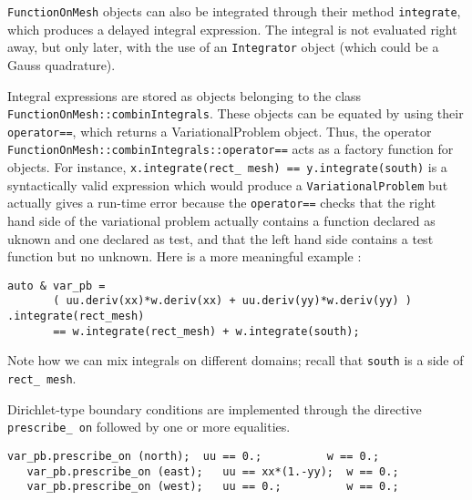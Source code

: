 {\small\tt FunctionOnMesh} objects can also be integrated through their method
{\small\tt integrate}, which produces a delayed integral expression.
The integral is not evaluated right away, but only later, with the use of an
{\small\tt Integrator} object (which could be a Gauss quadrature).

Integral expressions are stored as objects belonging to the class\hfil\break
{\small\tt FunctionOnMesh::combinIntegrals}.
These objects can be equated by using their\hfil\break
{\small\tt operator==}, which returns a {VariationalProblem} object.
Thus, the operator\hfil\break
{\small\tt FunctionOnMesh::combinIntegrals::operator==} acts as a factory function
for\hfil{} objects.
For instance, {\small\tt x.integrate(rect\_\,mesh) == y.integrate(south)} is a syntactically valid
expression which would produce a {\small\tt VariationalProblem} but actually
gives a run-time error because the {\small\tt operator==} checks that the right hand side
of the variational problem actually contains a function declared as uknown and one
declared as test, and that the left hand side contains a test function but no unknown.
Here is a more meaningful example :

\begin{Verbatim}[commandchars=\\\{\},formatcom=\small\tt,
   baselinestretch=0.94,framesep=2mm                      ]
   auto & var_pb =
       ( uu.deriv(xx)*w.deriv(xx) + uu.deriv(yy)*w.deriv(yy) ) .integrate(rect_mesh)
       == w.integrate(rect_mesh) + w.integrate(south);
\end{Verbatim}

Note how we can mix integrals on different domains; recall that {\small\tt south} is
a side of {\small\tt rect\_\,mesh}.

Dirichlet-type boundary conditions are implemented through the directive
{\small\tt prescribe\_\,on} followed by one or more equalities.

\begin{Verbatim}[commandchars=\\\{\},formatcom=\small\tt,
   baselinestretch=0.94,framesep=2mm                      ] 
   var_pb.prescribe_on (north);  uu == 0.;          w == 0.;
   var_pb.prescribe_on (east);   uu == xx*(1.-yy);  w == 0.;
   var_pb.prescribe_on (west);   uu == 0.;          w == 0.;
\end{Verbatim}

